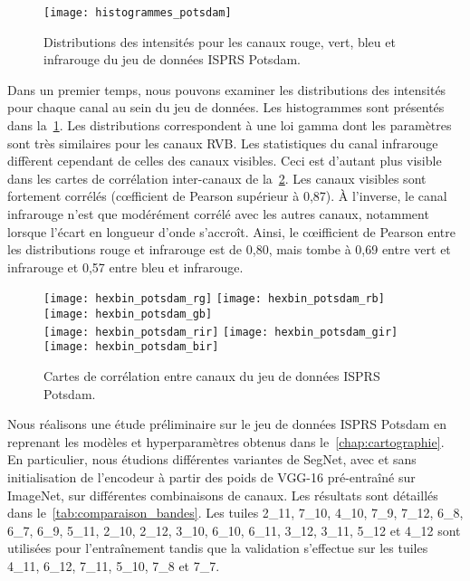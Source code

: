 \begin{figure}[h]
  \texttt{[image: histogrammes\_potsdam]}
  \caption{Distributions des intensités pour les canaux rouge, vert, bleu et infrarouge du jeu de données \gls{ISPRS} Potsdam.}
  \label{fig:potsdam_histograms}
\end{figure}

Dans un premier temps, nous pouvons examiner les distributions des intensités pour chaque canal au sein du jeu de données. Les histogrammes sont présentés dans la~\cref{fig:potsdam_histograms}. Les distributions correspondent à une loi gamma dont les paramètres sont très similaires pour les canaux \gls{RVB}. Les statistiques du canal infrarouge diffèrent cependant de celles des canaux visibles. Ceci est d'autant plus visible dans les cartes de corrélation inter-canaux de la~\cref{fig:potsdam_correlations}. Les canaux visibles sont fortement corrélés (c\oe{}fficient de Pearson supérieur à 0,87). À l'inverse, le canal infrarouge n'est que modérément corrélé avec les autres canaux, notamment lorsque l'écart en longueur d'onde s'accroît. Ainsi, le c\oe{}ifficient de Pearson entre les distributions rouge et infrarouge est de 0,80, mais tombe à 0,69 entre vert et infrarouge et 0,57 entre bleu et infrarouge.

\begin{figure}[h]
  \texttt{[image: hexbin\_potsdam\_rg]}
  \texttt{[image: hexbin\_potsdam\_rb]}
  \texttt{[image: hexbin\_potsdam\_gb]}\\
  \texttt{[image: hexbin\_potsdam\_rir]}
  \texttt{[image: hexbin\_potsdam\_gir]}
  \texttt{[image: hexbin\_potsdam\_bir]}
  \caption{Cartes de corrélation entre canaux du jeu de données \gls{ISPRS} Potsdam.}
  \label{fig:potsdam_correlations}
\end{figure}


Nous réalisons une étude préliminaire sur le jeu de données \gls{ISPRS} Potsdam en reprenant les modèles et hyperparamètres obtenus dans le~\cref{chap:cartographie}. En particulier, nous étudions différentes variantes de SegNet, avec et sans initialisation de l'encodeur à partir des poids de VGG-16 pré-entraîné sur ImageNet, sur différentes combinaisons de canaux. Les résultats sont détaillés dans le~\cref{tab:comparaison_bandes}. Les tuiles 2\_11, 7\_10, 4\_10, 7\_9, 7\_12, 6\_8, 6\_7, 6\_9, 5\_11, 2\_10, 2\_12, 3\_10, 6\_10, 6\_11, 3\_12, 3\_11, 5\_12 et 4\_12 sont utilisées pour l'entraînement tandis que la validation s'effectue sur les tuiles 4\_11, 6\_12, 7\_11, 5\_10, 7\_8 et 7\_7.


